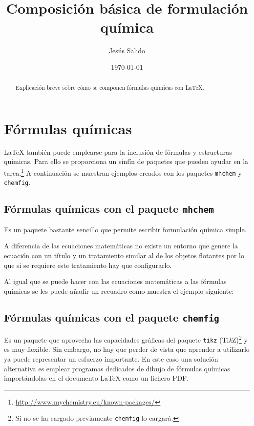 \documentclass[11pt,a4paper]{article}
\author{Jesús Salido}
\title{Composición básica de formulación química}
\date{\today}
\begin{document}
\maketitle

\begin{abstract}
	Explicación breve sobre cómo se componen fórmulas químicas con \LaTeX{}.
\end{abstract}

\section{Fórmulas químicas}
\LaTeX{} también puede emplearse para la inclusión de fórmulas y estructuras químicas. Para ello se proporciona un sinfín de paquetes que pueden ayudar en la tarea.\footnote{\url{http://www.mychemistry.eu/known-packages/}} A continuación se muestran ejemplos creados con los paquetes \texttt{mhchem} y \texttt{chemfig}.



\subsection{Fórmulas químicas con el paquete \texttt{mhchem}}
Es un paquete bastante sencillo que permite escribir formulación química simple.

\begin{center}
\end{center}


A diferencia de las ecuaciones matemáticas no existe un entorno que genere la ecuación con un título y un tratamiento similar al de los objetos flotantes por lo que si se requiere este tratamiento hay que configurarlo.

Al igual que se puede hacer con las ecuaciones matemáticas a las fórmulas químicas se les puede añadir un recuadro como muestra el ejemplo siguiente:

\begin{center}
{\fboxsep 8pt \fboxrule 0.5pt
}
\end{center}


\subsection{Fórmulas químicas con el paquete \texttt{chemfig}}
Es un paquete que aprovecha las capacidades gráficas del paquete \texttt{tikz} (Ti\textit{k}Z)\footnote{Si no se ha cargado previamente \texttt{chemfig} lo cargará.} y es muy flexible. Sin embargo, no hay que perder de vista que aprender a utilizarlo ya puede representar un esfuerzo importante. En este caso una solución alternativa es emplear programas dedicados de dibujo de fórmulas químicas importándolas en el documento \LaTeX{} como un fichero PDF.
\end{document}
